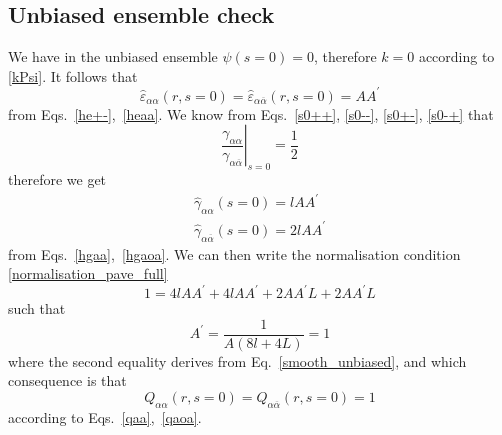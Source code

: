 \documentclass[pre,aps,superscriptaddress,nofootinbib]{revtex4}
\begin{document}
\subsection{Unbiased ensemble check}

We have in the unbiased ensemble $\psi(s = 0) = 0$, therefore $k = 0$ according to \eqref{kPsi}. It follows that
\begin{equation}
\hat{\varepsilon}_{\alpha\alpha}(r, s=0) = \hat{\varepsilon}_{\alpha\overline{\alpha}}(r, s=0) = A A^{\prime}
\end{equation}
from Eqs.~\ref{he+-},~\ref{heaa}. We know from Eqs.~\ref{s0++}, \ref{s0--}, \ref{s0+-}, \ref{s0-+} that
\begin{equation}
\left. \frac{\gamma_{\alpha\alpha}}{\gamma_{\alpha\overline{\alpha}}} \right|_{s=0} = \frac{1}{2}
\end{equation}
therefore we get
\begin{eqnarray}
\hat{\gamma}_{\alpha\alpha}(s=0) = l A A^{\prime}\\
\hat{\gamma}_{\alpha\overline{\alpha}}(s=0) = 2 l A A^{\prime}
\end{eqnarray}
from Eqs.~\ref{hgaa},~\ref{hgaoa}. We can then write the normalisation condition \eqref{normalisation_pave_full}
\begin{equation}
1 = 4 l A A^{\prime} + 4 l A A^{\prime} + 2 A A^{\prime} L + 2 A A^{\prime} L
\end{equation}
such that
\begin{equation}
A^{\prime} = \frac{1}{A( 8 l + 4 L)} = 1
\end{equation}
where the second equality derives from Eq.~\ref{smooth_unbiased}, and which consequence is that
\begin{equation}
Q_{\alpha\alpha}(r, s=0) = Q_{\alpha\overline{\alpha}}(r, s=0) = 1
\end{equation}
according to Eqs.~\ref{qaa},~\ref{qaoa}.



{\renewcommand{\bibname}{References}}
\end{document}
